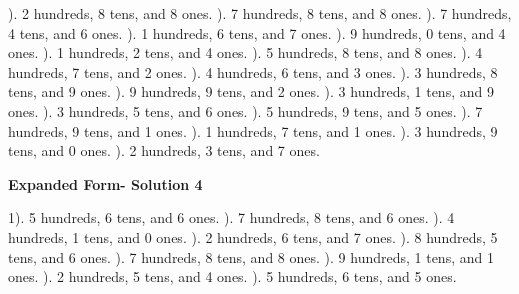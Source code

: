 \documentclass{article}%
\begin{document}
). 2 hundreds, 8 tens, and 8 ones.%
). 7 hundreds, 8 tens, and 8 ones.%
). 7 hundreds, 4 tens, and 6 ones.%
). 1 hundreds, 6 tens, and 7 ones.%
). 9 hundreds, 0 tens, and 4 ones.%
). 1 hundreds, 2 tens, and 4 ones.%
). 5 hundreds, 8 tens, and 8 ones.%
). 4 hundreds, 7 tens, and 2 ones.%
). 4 hundreds, 6 tens, and 3 ones.%
). 3 hundreds, 8 tens, and 9 ones.%
). 9 hundreds, 9 tens, and 2 ones.%
). 3 hundreds, 1 tens, and 9 ones.%
). 3 hundreds, 5 tens, and 6 ones.%
). 5 hundreds, 9 tens, and 5 ones.%
). 7 hundreds, 9 tens, and 1 ones.%
). 1 hundreds, 7 tens, and 1 ones.%
). 3 hundreds, 9 tens, and 0 ones.%
). 2 hundreds, 3 tens, and 7 ones.%
\newline%
\newpage%
\large%
\begin{center}%
\textbf{Expanded Form- Solution 4}%
\newline%
\end{center} \normalsize%
1). 5 hundreds, 6 tens, and 6 ones.%
). 7 hundreds, 8 tens, and 6 ones.%
). 4 hundreds, 1 tens, and 0 ones.%
). 2 hundreds, 6 tens, and 7 ones.%
). 8 hundreds, 5 tens, and 6 ones.%
). 7 hundreds, 8 tens, and 8 ones.%
). 9 hundreds, 1 tens, and 1 ones.%
). 2 hundreds, 5 tens, and 4 ones.%
). 5 hundreds, 6 tens, and 5 ones.%
\newline%
\end{document}
